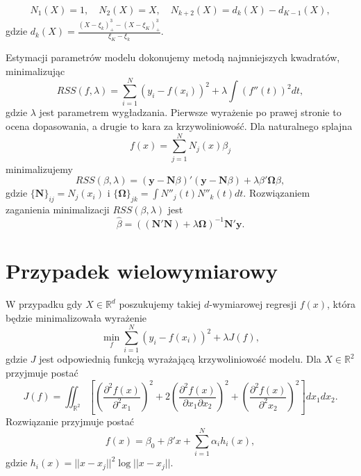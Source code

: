 \documentclass[]{book}
\theoremstyle{plain}
\theoremstyle{definition}
\theoremstyle{definition}
\theoremstyle{definition}
\theoremstyle{definition}
\theoremstyle{remark}
\begin{document}
\begin{gather}
    N_1(X)=1,\quad N_2(X)=X,\quad N_{k+2}(X)=d_k(X)-d_{K-1}(X),
\end{gather}
gdzie \(d_k(X)=\frac{(X-\xi_k)^3_+-(X-\xi_K)^3_+}{\xi_K-\xi_k}.\)

Estymacji parametrów modelu dokonujemy metodą najmniejszych kwadratów, minimalizując
\begin{equation}
    RSS(f,\lambda) = \sum_{i=1}^N(y_i-f(x_i))^2+\lambda\int(f''(t))^2dt,
\end{equation}
gdzie \(\lambda\) jest parametrem wygładzania. Pierwsze wyrażenie po prawej stronie to ocena dopasowania, a drugie to kara za krzywoliniowość.
Dla naturalnego splajna
\begin{equation}
    f(x)=\sum_{j=1}^NN_j(x)\beta_j
\end{equation}
minimalizujemy
\begin{equation}
    RSS(\beta, \lambda)=(\boldsymbol y -\boldsymbol N\beta)'(\boldsymbol y-\boldsymbol N\beta)+\lambda\beta'\boldsymbol \Omega \beta,
\end{equation}
gdzie \(\{\boldsymbol N\}_{ij}= N_j(x_i)\) i \(\{\boldsymbol \Omega\}_{jk}=\int N''_j(t)N''_k(t)dt\). Rozwiązaniem zaganienia minimalizacji \(RSS(\beta,\lambda)\) jest
\begin{equation}
    \hat{\beta}=((\boldsymbol N'\boldsymbol N)+\lambda\boldsymbol \Omega)^{-1}\boldsymbol N'\boldsymbol y.
\end{equation}

\hypertarget{przypadek-wielowymiarowy}{%
\section{Przypadek wielowymiarowy}\label{przypadek-wielowymiarowy}}

W przypadku gdy \(X\in \mathbb{R}^d\) poszukujemy takiej \(d\)-wymiarowej regresji \(f(x)\), która będzie minimalizowała wyrażenie
\begin{equation}
    \min_f\sum_{i=1}^N(y_i-f(x_i))^2+\lambda J(f),
\end{equation}
gdzie \(J\) jest odpowiednią funkcją wyrażającą krzywoliniowość modelu. Dla \(X\in \mathbb{R}^2\) przyjmuje postać
\begin{equation}
    J(f)=\iint_{\mathbb{R}^2}\left[\left(\frac{\partial^2 f(x)}{\partial^2 x_1}\right)^2+2\left(\frac{\partial^2 f(x)}{\partial x_1\partial x_2}\right)^2+
    \left(\frac{\partial^2 f(x)}{\partial^2 x_2}\right)^2\right]dx_1dx_2.
\end{equation}
Rozwiązanie przyjmuje postać
\begin{equation}
    f(x) = \beta_0+\beta'x+\sum_{i=1}^N \alpha_ih_i(x),
\end{equation}
gdzie \(h_i(x)=||x-x_j||^2\log||x-x_j||\).
\end{document}
